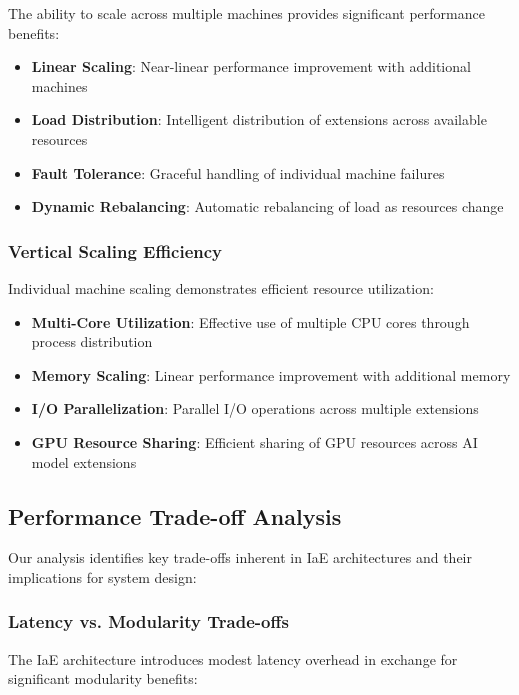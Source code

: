 The ability to scale across multiple machines provides significant performance benefits:

\begin{itemize}
    \item \textbf{Linear Scaling}: Near-linear performance improvement with additional machines
    \item \textbf{Load Distribution}: Intelligent distribution of extensions across available resources
    \item \textbf{Fault Tolerance}: Graceful handling of individual machine failures
    \item \textbf{Dynamic Rebalancing}: Automatic rebalancing of load as resources change
\end{itemize}

\subsubsection{Vertical Scaling Efficiency}

Individual machine scaling demonstrates efficient resource utilization:

\begin{itemize}
    \item \textbf{Multi-Core Utilization}: Effective use of multiple CPU cores through process distribution
    \item \textbf{Memory Scaling}: Linear performance improvement with additional memory
    \item \textbf{I/O Parallelization}: Parallel I/O operations across multiple extensions
    \item \textbf{GPU Resource Sharing}: Efficient sharing of GPU resources across AI model extensions
\end{itemize}

\subsection{Performance Trade-off Analysis}

Our analysis identifies key trade-offs inherent in IaE architectures and their implications for system design:

\subsubsection{Latency vs. Modularity Trade-offs}

The IaE architecture introduces modest latency overhead in exchange for significant modularity benefits:

